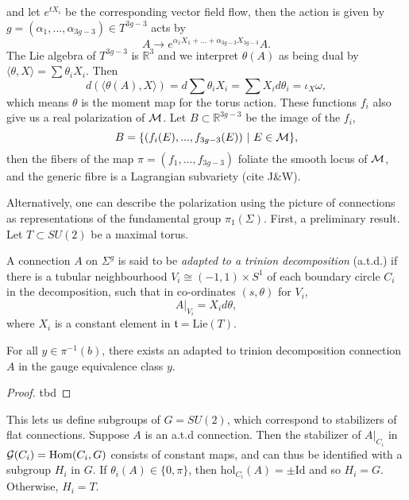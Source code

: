 	and let $e^{tX_i}$ be the corresponding vector field flow, then the action is given by $g = (\alpha_1,...,\alpha_{3g-3}) \in T^{3g-3}$ acts by
	\begin{equation}
		A \to e^{\alpha_1 X_1 + ... + \alpha_{3g-3}X_{3g-3}}A.
	\end{equation}
	 The Lie algebra of $T^{3g-3}$ is $
	\mathbb{R}^3$ and we interpret $\theta(A)$ as being dual by $\langle \theta, X \rangle = \sum \theta_i X_i$. Then
	\begin{equation}
		d\left(\langle \theta(A),X\rangle\right) = d\sum\theta_i X_i = \sum X_i d\theta_i = \iota_{X}\omega,
	\end{equation}
	which means $\theta$ is the moment map for the torus action. These functions $f_i$ also give us a real polarization of $\mathcal{M}$. Let $B \subset \mathbb{R}^{3g-3}$ be the image of the $f_i$,
	\begin{equation}
		B = \{(f_i(E),...,f_{3g-3}(E))~|~ E \in \mathcal{M}\},
		\label{e:B-def}
	\end{equation}
	then the fibers of the map $\pi = (f_1,...,f_{3g-3})$ foliate the smooth locus of $\mathcal{M}$, and the generic fibre is a Lagrangian subvariety (cite J\&W). 
	
	Alternatively, one can describe the polarization using the picture of connections as representations of the fundamental group $\pi_1(\Sigma)$. First, a preliminary result. Let $T\subset SU(2)$ be a maximal torus.
	\begin{definition}
		A connection $A$ on $\Sigma^g$ is said to be \emph{adapted to a trinion decomposition} (a.t.d.) if there is a tubular neighbourhood $V_i \cong (-1,1)\times S^1$ of each boundary circle $C_i$ in the decomposition, such that in co-ordinates $(s,\theta)$ for $V_i$,
		\begin{equation}
			A|_{V_i} = X_i d\theta, 
		\end{equation}
		where $X_i$ is a constant element in $\mathfrak{t} = \text{Lie}(T)$.
	\end{definition}
	\begin{theorem}
		For all $y\in \pi^{-1}(b)$, there exists an adapted to trinion decomposition connection $A$ in the gauge equivalence class $y$.
	\end{theorem}
	\begin{proof}
	tbd
	\end{proof}
	
	This lets us define subgroups of $G=SU(2)$, which correspond to stabilizers of flat connections. Suppose $A$ is an a.t.d connection. Then the stabilizer of $A|_{C_i}$ in $\mathcal{G}(C_i) = \text{Hom}(C_i, G)$ consists of constant maps, and can thus be identified with a subgroup $H_i$ in $G$. If $\theta_i(A) \in \{0,\pi\}$, then $\text{hol}_{C_i}(A) = \pm\text{Id}$ and so $H_i = G$. Otherwise, $H_i = T$. 
	

